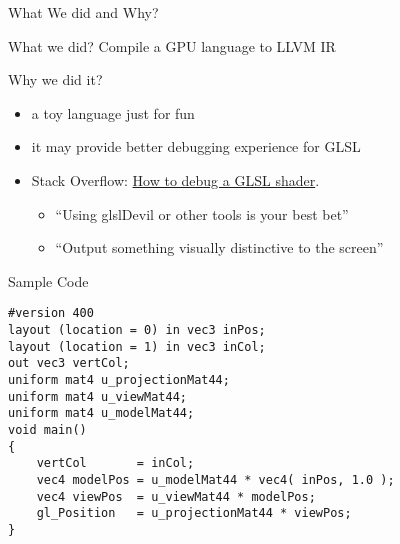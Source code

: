 \begin{frame}{What We did and Why?}
    \begin{block}{What we did?}
        Compile a GPU language to LLVM IR
    \end{block}

    \begin{block}{Why we did it?}
        \begin{itemize}
            \item a toy language just for fun
            \item it may provide better debugging experience for GLSL
            \item Stack Overflow: \href{https://stackoverflow.com/questions/2508818/how-to-debug-a-glsl-shader}{How to debug a GLSL shader}.
            \begin{itemize}
                \item ``Using glslDevil or other tools is your best bet''
                \item ``Output something visually distinctive to the screen''    
            \end{itemize}
        \end{itemize}
    \end{block}

\end{frame}

\begin{frame}[fragile]{Sample Code}
   \begin{lstlisting}
#version 400
layout (location = 0) in vec3 inPos;
layout (location = 1) in vec3 inCol;
out vec3 vertCol;
uniform mat4 u_projectionMat44;
uniform mat4 u_viewMat44;
uniform mat4 u_modelMat44;
void main()
{
    vertCol       = inCol;
    vec4 modelPos = u_modelMat44 * vec4( inPos, 1.0 );
    vec4 viewPos  = u_viewMat44 * modelPos;
    gl_Position   = u_projectionMat44 * viewPos;
}
   \end{lstlisting}
\end{frame}
